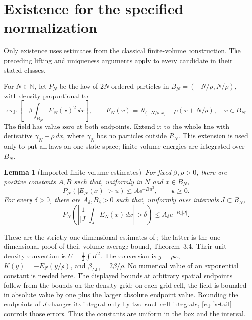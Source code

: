 \documentclass[11pt,reqno]{amsart}
\newtheorem{lemma}[theorem]{Lemma}
\theoremstyle{definition}
\theoremstyle{remark}
\newcommand{\1}{\mathbf 1}
\numberwithin{equation}{section}
\begin{document}
\section{Existence for the specified normalization}\label{sec:existence}

Only existence uses estimates from the classical finite-volume
construction.  The preceding lifting and uniqueness arguments apply to
every candidate in their stated classes.

For $N\in\mathbb N$, let $P_N$ be the law of $2N$ ordered particles in
$B_N=(-N/\rho,N/\rho)$, with density proportional to
\[
 \exp\left[-\beta\int_{B_N} E_N(x)^2\,dx\right],\qquad
 E_N(x)=N_{(-N/\rho,x]}-\rho(x+N/\rho),\quad x\in B_N.
\]
The field has value zero at both endpoints. Extend it to the whole line
with derivative $\gamma_N-\rho\,dx$, where $\gamma_N$ has no particles
outside $B_N$. This extension is used only to put all laws on one state
space; finite-volume energies are integrated over $B_N$.

\begin{lemma}[Imported finite-volume estimates]\label{lem:fv-estimates}
For fixed $\beta,\rho>0$, there are positive constants $A,B$ such that,
uniformly in $N$ and $x\in B_N$,
\begin{equation}\label{eq:fv-tail}
 P_N(|E_N(x)|>u)\le A e^{-Bu^3},\qquad u\ge0.
\end{equation}
For every $\delta>0$, there are $A_\delta,B_\delta>0$ such that, uniformly
over intervals $J\subset B_N$,
\begin{equation}\label{eq:fv-average}
 P_N\left(\left|\frac1{|J|}\int_J E_N(x)\,dx\right|>\delta\right)
 \le A_\delta e^{-B_\delta |J|}.
\end{equation}
\end{lemma}

These are the strictly one-dimensional estimates of
\cite[Theorem~6.2 and Proposition~8.1]{AJJ}; the latter is the
one-dimensional proof of their volume-average bound, Theorem~3.4.
Their unit-density convention is $U=\frac12\int K^2$.
The conversion is $y=\rho x$, $K(y)=-E_N(y/\rho)$, and
$\beta_{\mathrm{AJJ}}=2\beta/\rho$. No numerical value of an exponential
constant is needed here. The displayed bounds at arbitrary spatial
endpoints follow from the bounds on the density grid: on each grid cell,
the field is bounded in absolute value by one plus the larger absolute
endpoint value. Rounding the endpoints of $J$ changes its integral only
by two such cell integrals; \eqref{eq:fv-tail} controls those errors.
Thus the constants are uniform in the box and the interval.
\end{document}
